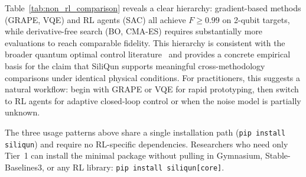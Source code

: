Table~\ref{tab:non_rl_comparison} reveals a clear hierarchy: gradient-based methods
(GRAPE, VQE) and RL agents (SAC) all achieve $F \geq 0.99$ on 2-qubit targets, while
derivative-free search (BO, CMA-ES) requires substantially more evaluations to reach
comparable fidelity. This hierarchy is consistent with the broader quantum optimal
control literature~\cite{Wittler2021,Noiri2022} and provides a concrete empirical
basis for the claim that SiliQun supports meaningful cross-methodology comparisons
under identical physical conditions. For practitioners, this suggests a natural
workflow: begin with GRAPE or VQE for rapid prototyping, then switch to RL agents
for adaptive closed-loop control or when the noise model is partially unknown.

The three usage patterns above share a single installation path
(\texttt{pip install siliqun}) and require no RL-specific dependencies.
Researchers who need only Tier~1 can install the minimal package without
pulling in Gymnasium, Stable-Baselines3, or any RL library:
\texttt{pip install siliqun[core]}.
